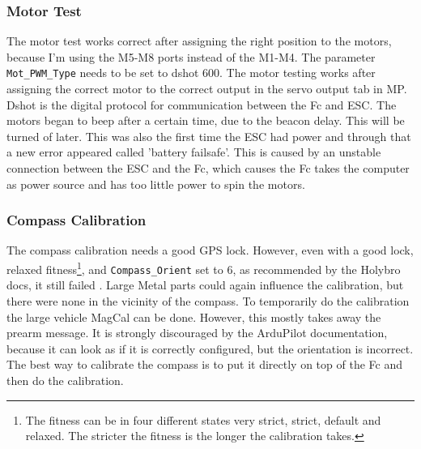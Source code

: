 \documentclass[svgnames]{article}
\begin{document}
	\subsubsection{Motor Test}
	The motor test works correct after assigning the right position to the motors, because I'm using the M5-M8 ports instead of the M1-M4. The parameter \lstinline|Mot_PWM_Type| needs to be set to dshot 600. The motor testing works after assigning the correct motor to the correct output in the servo output tab in \gls{MP}. Dshot is the digital protocol for communication between the \gls{Fc} and \gls{ESC}. The motors began to beep after a certain time, due to the beacon delay. This will be turned of later. This was also the first time the \gls{ESC} had power and through that a new error appeared called 'battery failsafe'. This is caused by an unstable connection between the \gls{ESC} and the \gls{Fc}, which causes the \gls{Fc} takes the computer as power source and has too little power to spin the motors.
	
	\subsubsection{Compass Calibration}
	The compass calibration needs a good \gls{GPS} lock. However, even with a good lock, relaxed fitness\footnote{The fitness can be in four different states very strict, strict, default and relaxed. The stricter the fitness is the longer the calibration takes.}, and \lstinline|Compass_Orient| set to 6, as recommended by the Holybro docs, it still failed \cite{HolybroDocs}. Large Metal parts could again influence the calibration, but there were none in the vicinity of the compass. To temporarily do the calibration the large vehicle MagCal can be done. However, this mostly takes away the prearm message. It is strongly discouraged by the ArduPilot documentation, because it can look as if it is correctly configured, but the orientation is incorrect. The best way to calibrate the compass is to put it directly on  top of the \gls{Fc} and then do the calibration.
\end{document}

